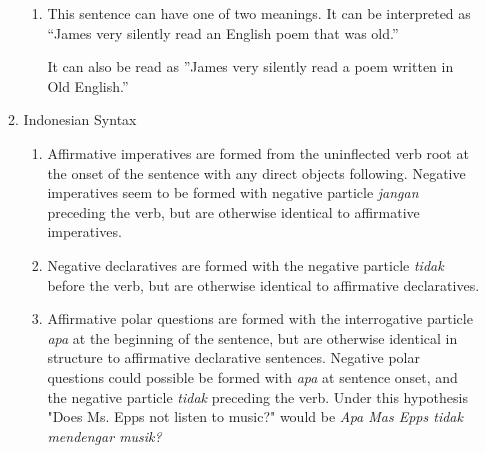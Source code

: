 \documentclass[12pt]{article}
\begin{document}
\begin{enumerate}
\begin{enumerate}
\begin{enumerate}
\item This sentence can have one of two meanings. It can be interpreted as ``James very silently read an English poem that was old.''\\


It can also be read as ''James very silently read a poem written in Old English.''


\end{enumerate}

\item Indonesian Syntax
\begin{enumerate}

\item Affirmative imperatives are formed from the uninflected verb root at the onset of the sentence with any direct objects following. Negative imperatives seem to be formed with negative particle {\it jangan} preceding the verb, but are otherwise identical to affirmative imperatives.

\item Negative declaratives are formed with the negative particle {\it tidak} before the verb, but are otherwise identical to affirmative declaratives.

\item Affirmative polar questions are formed with the interrogative particle {\it apa} at the beginning of the sentence, but are otherwise identical in structure to affirmative declarative sentences. Negative polar questions could possible be formed with {\it apa} at sentence onset, and the negative particle {\it tidak} preceding the verb. Under this hypothesis "Does Ms. Epps not listen to music?" would be {\it Apa Mas Epps tidak mendengar musik?}


\end{enumerate}
\end{enumerate}
\end{enumerate}
\end{document}
